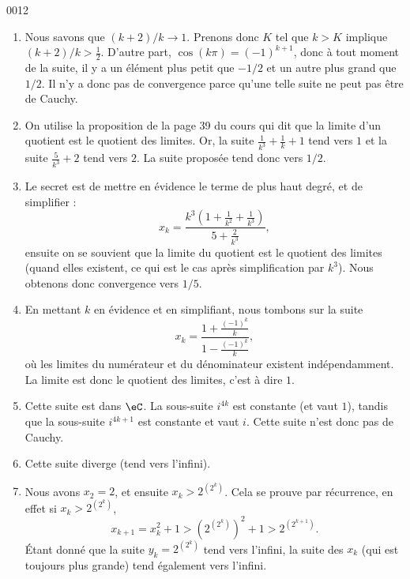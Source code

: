 
\begin{corrige}{0012}

\begin{enumerate}
\item Nous savons que $(k+2)/k\to 1$. Prenons donc $K$ tel que $k>K$ implique $(k+2)/k>\frac{ 1 }{2}$. D'autre part, $\cos(k\pi)=(-1)^{k+1}$, donc à tout moment de la suite, il y a un élément plus petit que $-1/2$ et un autre plus grand que $1/2$. Il n'y a donc pas de convergence parce qu'une telle suite ne peut pas être de Cauchy.

\item On utilise la proposition de la page 39 du cours qui dit que la limite d'un quotient est le quotient des limites. Or, la suite $\frac{1}{ k^3 }+\frac{1}{ k }+1$ tend vers $1$ et la suite $\frac{ 5 }{ k^3 }+2$ tend vers $2$. La suite proposée tend donc vers $1/2$.

\item Le secret est de mettre en évidence le terme de plus haut degré, et de simplifier :
\begin{equation}
	x_k=\frac{ k^3(1+\frac{1}{ k^2 }+\frac{1}{ k^3 }) }{ 5+\frac{ 2 }{ k^3 } },
\end{equation}
ensuite on se souvient que la limite du quotient est le quotient des limites (quand elles existent, ce qui est le cas après simplification par $k^3$). Nous obtenons donc convergence vers $1/5$.

\item 
En mettant $k$ en évidence et en simplifiant, nous tombons sur la suite
\begin{equation}
	x_k=\frac{    1+\frac{ (-1)^k }{ k }   }{  1-\frac{ (-1)^k }{ k }  },
\end{equation}
où les limites du numérateur et du dénominateur existent indépendamment. La limite est donc le quotient des limites, c'est à dire $1$.
\item  Cette suite est dans $\eC$. La sous-suite $i^{4k}$ est constante (et vaut $1$), tandis que la sous-suite $i^{4k+1}$ est constante et vaut $i$. Cette suite n'est donc pas de Cauchy.
\item Cette suite diverge (tend vers l'infini).
\item Nous avons $x_2=2$, et ensuite $x_k>2^{(2^k)}$. Cela se prouve par récurrence, en effet si $x_k>2^{(2^k)}$,
\begin{equation}
	x_{k+1}=x_k^2+1>\left( 2^{(2^k)} \right)^2+1>2^{(2^{k+1})}.
\end{equation}
Étant donné que la suite $y_k=2^{(2^k)}$ tend vers l'infini, la suite des $x_k$ (qui est toujours plus grande) tend également vers l'infini.


\end{enumerate}
\end{corrige}
